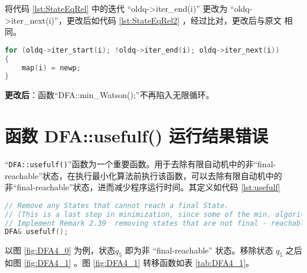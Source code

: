 将代码 \ref{lst:StateEqRel} 中的迭代 “oldq->iter\_end(i)” 更改为 “oldq->iter\_next(i)”，更改后如代码 \ref{lst:StateEqRel2} ，经过比对，更改后与原文 \cite{watson1994design} 相同。
\lstset{style=mystyle}
\begin{lstlisting}[language=C++,label={lst:StateEqRel2},caption={StateEqRel.cpp}]
for (oldq->iter_start(i); !oldq->iter_end(i); oldq->iter_next(i))
{
    map(i) = newp;
}
\end{lstlisting}

{\bfseries 更改后}：函数“DFA::min\_Watson();”不再陷入无限循环。


\section{函数 DFA::usefulf() 运行结果错误}

“\verb+DFA::usefulf()+”函数为一个重要函数。用于去除有限自动机中的非“final-reachable”状态，在执行最小化算法前执行该函数，可以去除有限自动机中的非“final-reachable”状态，进而减少程序运行时间。其定义如代码 \ref{lst:usefulf}
\lstset{style=mystyle}
\begin{lstlisting}[language=C++,label={lst:usefulf},caption={DFA::usefulf()}]
// Remove any States that cannot reach a final State.
// (This is a last step in minimization, since some of the min. algorithms may yield a DFA with a sink state.)
// Implement Remark 2.39  removing states that are not final - reachable.
DFA& usefulf();
\end{lstlisting}
以图 \ref{fig:DFA4_0} 为例，状态$q_5$ 即为非 “final-reachable” 状态。移除状态 $q_5$ 之后如图 \ref{fig:DFA4_1} 。图 \ref{fig:DFA4_1} 转移函数如表 \ref{tab:DFA4_1}。

